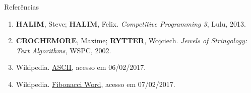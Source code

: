 \begin{frame}[fragile]{Referências}

    \begin{enumerate}
        \item \textbf{HALIM}, Steve; \textbf{HALIM}, Felix. \textit{Competitive Programming 3}, Lulu, 2013.

        \item \textbf{CROCHEMORE}, Maxime; \textbf{RYTTER}, Wojciech. \textit{Jewels of Stringology: Text Algorithms}, WSPC, 2002.

        \item Wikipedia. \href{https://pt.wikipedia.org/wiki/ASCII}{ASCII}, acesso em 06/02/2017.

        \item Wikipedia. \href{https://en.wikipedia.org/wiki/Fibonacci\_word}{Fibonacci Word},
            acesso em 07/02/2017.
    \end{enumerate}

\end{frame}
